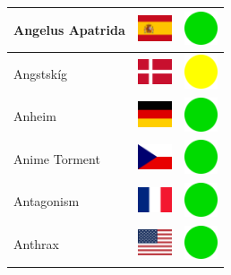 \documentclass[12pt, a4paper, twoside]{report}
\begin{document}
\begin{center}
\begin{longtable}{|p{5cm}|p{2cm}|p{2cm}|}
 Angelus Apatrida                                           & \includegraphics[width=1cm]{../img/flags/es} &   \includegraphics[width=1cm]{../likes/y} \\ \hline
 Angstskíg                                                  & \includegraphics[width=1cm]{../img/flags/dk} &   \includegraphics[width=1cm]{../likes/m} \\ \hline
 Anheim                                                     & \includegraphics[width=1cm]{../img/flags/de} &   \includegraphics[width=1cm]{../likes/y} \\ \hline
 Anime Torment                                              & \includegraphics[width=1cm]{../img/flags/cz} &   \includegraphics[width=1cm]{../likes/y} \\ \hline
 Antagonism                                                 & \includegraphics[width=1cm]{../img/flags/fr} &   \includegraphics[width=1cm]{../likes/y} \\ \hline
 Anthrax                                                    & \includegraphics[width=1cm]{../img/flags/us} &   \includegraphics[width=1cm]{../likes/y} \\ \hline

\end{longtable}
\end{center}
\end{document}
